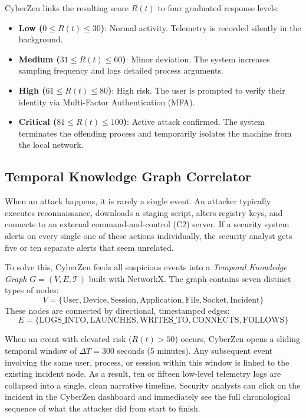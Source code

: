 \documentclass[conference]{IEEEtran}
\begin{document}
CyberZen links the resulting score $R(t)$ to four graduated response levels:
\begin{itemize}
    \item \textbf{Low ($0 \le R(t) \le 30$)}: Normal activity. Telemetry is recorded silently in the background.
    \item \textbf{Medium ($31 \le R(t) \le 60$)}: Minor deviation. The system increases sampling frequency and logs detailed process arguments.
    \item \textbf{High ($61 \le R(t) \le 80$)}: High risk. The user is prompted to verify their identity via Multi-Factor Authentication (MFA).
    \item \textbf{Critical ($81 \le R(t) \le 100$)}: Active attack confirmed. The system terminates the offending process and temporarily isolates the machine from the local network.
\end{itemize}

\subsection{Temporal Knowledge Graph Correlator}
When an attack happens, it is rarely a single event. An attacker typically executes reconnaissance, downloads a staging script, alters registry keys, and connects to an external command-and-control (C2) server. If a security system alerts on every single one of these actions individually, the security analyst gets five or ten separate alerts that seem unrelated.

To solve this, CyberZen feeds all suspicious events into a \textit{Temporal Knowledge Graph} $G = (V, E, \mathcal{T})$ built with NetworkX. The graph contains seven distinct types of nodes:
\begin{equation}
V = \{\text{User}, \text{Device}, \text{Session}, \text{Application}, \text{File}, \text{Socket}, \text{Incident}\}
\end{equation}
These nodes are connected by directional, timestamped edges:
\begin{equation}
E = \{\text{LOGS\_INTO}, \text{LAUNCHES}, \text{WRITES\_TO}, \text{CONNECTS}, \text{FOLLOWS}\}
\end{equation}

When an event with elevated risk ($R(t) > 50$) occurs, CyberZen opens a sliding temporal window of $\Delta T = 300$ seconds (5 minutes). Any subsequent event involving the same user, process, or session within this window is linked to the existing incident node. As a result, ten or fifteen low-level telemetry logs are collapsed into a single, clean narrative timeline. Security analysts can click on the incident in the CyberZen dashboard and immediately see the full chronological sequence of what the attacker did from start to finish.
\end{document}
